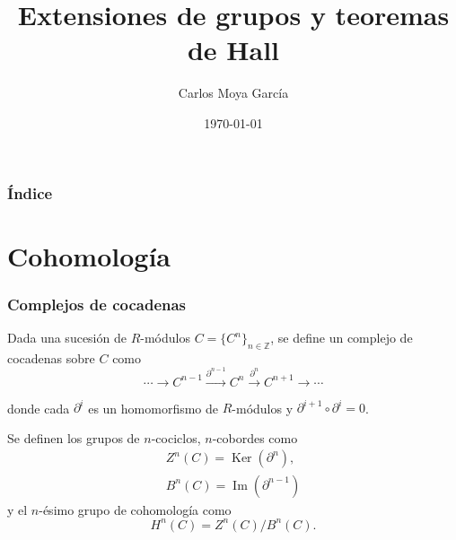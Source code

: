 \documentclass[
	11pt, %
]{beamer}
\title[]{Extensiones de grupos y teoremas de Hall}
\author{Carlos Moya García}
\institute[]{Universidad del País Vasco}
\date{\today}
\DeclareMathOperator{\Image}{Im}
\DeclareMathOperator{\Ker}{Ker}
\begin{document}
\begin{frame}
	\titlepage
\end{frame}

\begin{frame}
	\frametitle{Índice} %
	
	\tableofcontents %
\end{frame}


\section{Cohomología}

\begin{frame}
	\frametitle{Complejos de cocadenas}
	Dada una sucesión de $R$-módulos $C = \{C^n\}_{n\in\mathbb Z}$, se define un complejo de cocadenas sobre $C$ como
	\begin{equation*}
		\cdots  \xrightarrow{} C^{n-1} \xrightarrow{\partial^{n-1}} C^n \xrightarrow{\partial^n} C^{n+1} \xrightarrow{} \cdots 
	\end{equation*}
	
	donde cada $\partial^{i}$ es un homomorfismo de $R$-módulos y $\partial^{i+1}\circ \partial^i = 0$.
	
	\bigskip 
	
	Se definen los grupos de $n$-cociclos, $n$-cobordes como
	\begin{gather*}
		Z^n(C) = \Ker(\partial^n), \\
		B^n(C) = \Image(\partial^{n-1})
	\end{gather*}
	y el $n$-ésimo grupo de cohomología como
	\begin{equation*}
		H^n(C) = Z^n(C)/B^n(C).
	\end{equation*}
	
\end{frame}
\end{document}
